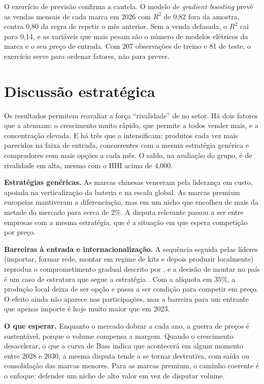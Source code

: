 \documentclass[article,11pt,oneside,a4paper,english,brazil,sumario=tradicional]{abntex2}
\begin{document}
O exercício de previsão confirma a cautela. O modelo de \textit{gradient boosting} prevê as vendas mensais de cada marca em 2026 com $R^2$ de 0,82 fora da amostra, contra 0,80 da regra de repetir o mês anterior. Sem a venda defasada, o $R^2$ cai para 0,14, e as variáveis que mais pesam são o número de modelos elétricos da marca e o seu preço de entrada. Com 207 observações de treino e 81 de teste, o exercício serve para ordenar fatores, não para prever.

\section{Discussão estratégica}\label{sec:discussao}

Os resultados permitem reavaliar a força ``rivalidade'' de  no setor. Há dois fatores que a atenuam: o crescimento muito rápido, que permite a todos vender mais, e a concentração elevada. E há três que a intensificam: produtos cada vez mais parecidos na faixa de entrada, concorrentes com a mesma estratégia genérica e compradores com mais opções a cada mês. O saldo, na avaliação do grupo, é de rivalidade em alta, mesmo com o HHI acima de 4.000.

\textbf{Estratégias genéricas.} As marcas chinesas venceram pela liderança em custo, apoiada na verticalização da bateria e na escala global. As marcas premium europeias mantiveram a diferenciação, mas em um nicho que encolheu de mais da metade do mercado para cerca de 2\%. A disputa relevante passou a ser entre empresas com a mesma estratégia, que é a situação em que  espera competição por preço.

\textbf{Barreiras à entrada e internacionalização.} A sequência seguida pelas líderes (importar, formar rede, montar em regime de kits e depois produzir localmente) reproduz o comprometimento gradual descrito por , e a decisão de montar no país é um caso de estrutura que segue a estratégia \cite{chandler1962}. Com a alíquota em 35\%, a produção local deixa de ser opção e passa a ser condição para competir em preço. O efeito ainda não aparece nas participações, mas a barreira para um entrante que apenas importe é hoje muito maior que em 2023.

\textbf{O que esperar.} Enquanto o mercado dobrar a cada ano, a guerra de preços é sustentável, porque o volume compensa a margem. Quando o crescimento desacelerar, o que a curva de Bass indica que acontecerá em algum momento entre 2028 e 2030, a mesma disputa tende a se tornar destrutiva, com saída ou consolidação das marcas menores. Para as marcas premium, o caminho coerente é o enfoque: defender um nicho de alto valor em vez de disputar volume.
\end{document}
